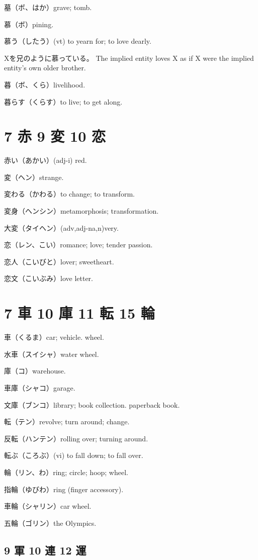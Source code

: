 墓（ボ、はか）grave; tomb.

慕（ボ）pining.

慕う（したう）(vt) to yearn for; to love dearly.

Xを兄のように慕っている。
The implied entity loves X as if
X were the implied entity's own older brother.

暮（ボ、くら）livelihood.

暮らす（くらす）to live; to get along.

\section{7 赤 9 変 10 恋}

赤い（あかい）(adj-i) red.

変（ヘン）strange.

変わる（かわる）to change; to transform.

変身（ヘンシン）metamorphosis; transformation.

大変（タイヘン）(adv,adj-na,n)very.

恋（レン、こい）romance; love; tender passion.

恋人（こいびと）lover; sweetheart.

恋文（こいぶみ）love letter.

\section{7 車 10 庫 11 転 15 輪}

車（くるま）car; vehicle. wheel.

水車（スイシャ）water wheel.

庫（コ）warehouse.

車庫（シャコ）garage.

文庫（ブンコ）library; book collection. paperback book.

転（テン）revolve; turn around; change.

反転（ハンテン）rolling over; turning around.

転ぶ（ころぶ）(vi) to fall down; to fall over.

輪（リン、わ）ring; circle; hoop; wheel.

指輪（ゆびわ）ring (finger accessory).

車輪（シャリン）car wheel.

五輪（ゴリン）the Olympics.

\subsection{9 軍 10 連 12 運}

